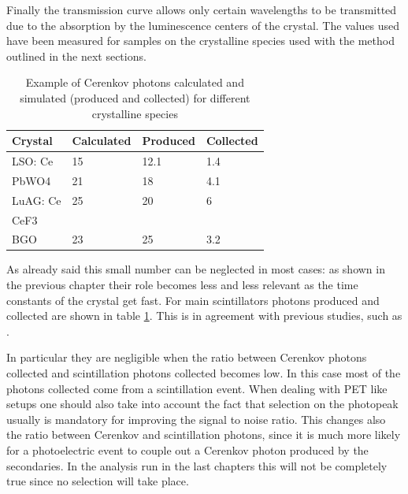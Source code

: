 Finally the transmission curve allows only certain wavelengths to be transmitted due to the absorption by the luminescence centers of the crystal. The values used have been measured for samples on the crystalline species used with the method outlined in the next sections.
\begin{table}[h]
\begin{center}
\begin{tabular}{|l|l|l|l|}
\hline
Crystal  & Calculated & Produced & Collected \\
\hline
LSO: Ce  & 15         & 12.1     & 1.4       \\
\hline
PbWO4    & 21         & 18       & 4.1       \\
\hline
LuAG: Ce & 25         & 20       & 6         \\
\hline
CeF3     &            &          &           \\
\hline
BGO      & 23         & 25       & 3.2     \\ 
\hline
\end{tabular}
\end{center}
\caption[Cerenkov photons]{Example of Cerenkov photons calculated and simulated (produced and collected) for different crystalline species}
\label{table:cer}
\end{table}

As already said this small number can be neglected in most cases: as shown in the previous chapter their role becomes less and less relevant as the time constants of the crystal get fast. For main  scintillators photons produced and collected are shown in table \ref{table:cer}. This is in agreement with previous studies, such as \cite{Brunner2014}.

In particular they are negligible when the ratio between Cerenkov photons collected and scintillation photons collected becomes low. In this case most of the photons collected come from a scintillation event.
When dealing with PET like setups one should also take into account the fact that selection on the photopeak usually is mandatory for improving the signal to noise ratio. This changes also the ratio between Cerenkov and scintillation photons, since it is much more likely for a photoelectric event to couple out a Cerenkov photon produced by the secondaries. In the analysis run in the last chapters this will not be completely true since no selection will take place.

